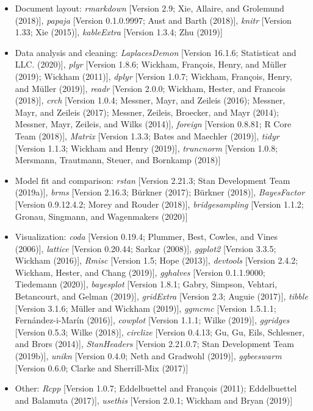 \documentclass[
  english,
  doc,floatsintext]{apa6}
\providecommand{\tightlist}{%
  \setlength{\itemsep}{0pt}\setlength{\parskip}{0pt}}
\begin{document}
\begin{itemize}
\tightlist
\item
  Document layout: \emph{rmarkdown} {[}Version 2.9; Xie, Allaire, and Grolemund (2018){]}, \emph{papaja} {[}Version 0.1.0.9997; Aust and Barth (2018){]}, \emph{knitr} {[}Version 1.33; Xie (2015){]}, \emph{kableExtra} {[}Version 1.3.4; Zhu (2019){]}
\item
  Data analysis and cleaning: \emph{LaplacesDemon} {[}Version 16.1.6; Statisticat and LLC. (2020){]}, \emph{plyr} {[}Version 1.8.6; Wickham, François, Henry, and Müller (2019); Wickham (2011){]}, \emph{dplyr} {[}Version 1.0.7; Wickham, François, Henry, and Müller (2019){]}, \emph{readr} {[}Version 2.0.0; Wickham, Hester, and Francois (2018){]}, \emph{crch} {[}Version 1.0.4; Messner, Mayr, and Zeileis (2016); Messner, Mayr, and Zeileis (2017); Messner, Zeileis, Broecker, and Mayr (2014); Messner, Mayr, Zeileis, and Wilks (2014){]}, \emph{foreign} {[}Version 0.8.81; R Core Team (2018){]}, \emph{Matrix} {[}Version 1.3.3; Bates and Maechler (2019){]}, \emph{tidyr} {[}Version 1.1.3; Wickham and Henry (2019){]}, \emph{truncnorm} {[}Version 1.0.8; Mersmann, Trautmann, Steuer, and Bornkamp (2018){]}
\item
  Model fit and comparison: \emph{rstan} {[}Version 2.21.3; Stan Development Team (2019a){]}, \emph{brms} {[}Version 2.16.3; Bürkner (2017); Bürkner (2018){]}, \emph{BayesFactor} {[}Version 0.9.12.4.2; Morey and Rouder (2018){]}, \emph{bridgesampling} {[}Version 1.1.2; Gronau, Singmann, and Wagenmakers (2020){]}
\item
  Visualization: \emph{coda} {[}Version 0.19.4; Plummer, Best, Cowles, and Vines (2006){]}, \emph{lattice} {[}Version 0.20.44; Sarkar (2008){]}, \emph{ggplot2} {[}Version 3.3.5; Wickham (2016){]}, \emph{Rmisc} {[}Version 1.5; Hope (2013){]}, \emph{devtools} {[}Version 2.4.2; Wickham, Hester, and Chang (2019){]}, \emph{gghalves} {[}Version 0.1.1.9000; Tiedemann (2020){]}, \emph{bayesplot} {[}Version 1.8.1; Gabry, Simpson, Vehtari, Betancourt, and Gelman (2019){]}, \emph{gridExtra} {[}Version 2.3; Auguie (2017){]}, \emph{tibble} {[}Version 3.1.6; Müller and Wickham (2019){]}, \emph{ggmcmc} {[}Version 1.5.1.1; Fernández-i-Marín (2016){]}, \emph{cowplot} {[}Version 1.1.1; Wilke (2019){]}, \emph{ggridges} {[}Version 0.5.3; Wilke (2018){]}, \emph{circlize} {[}Version 0.4.13; Gu, Gu, Eils, Schlesner, and Brors (2014){]}, \emph{StanHeaders} {[}Version 2.21.0.7; Stan Development Team (2019b){]}, \emph{unikn} {[}Version 0.4.0; Neth and Gradwohl (2019){]}, \emph{ggbeeswarm} {[}Version 0.6.0; Clarke and Sherrill-Mix (2017){]}
\item
  Other: \emph{Rcpp} {[}Version 1.0.7; Eddelbuettel and François (2011); Eddelbuettel and Balamuta (2017){]}, \emph{usethis} {[}Version 2.0.1; Wickham and Bryan (2019){]}
\end{itemize}
\end{document}
